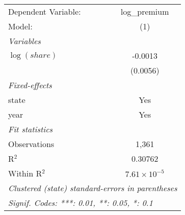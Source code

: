 
\begingroup
\centering
\begin{tabular}{lc}
   \tabularnewline \midrule \midrule
   Dependent Variable: & log\_premium\\   
   Model:              & (1)\\  
   \midrule
   \emph{Variables}\\
   $\log(share)$       & -0.0013\\   
                       & (0.0056)\\   
   \midrule
   \emph{Fixed-effects}\\
   state               & Yes\\  
   year                & Yes\\  
   \midrule
   \emph{Fit statistics}\\
   Observations        & 1,361\\  
   R$^2$               & 0.30762\\  
   Within R$^2$        & $7.61\times 10^{-5}$\\   
   \midrule \midrule
   \multicolumn{2}{l}{\emph{Clustered (state) standard-errors in parentheses}}\\
   \multicolumn{2}{l}{\emph{Signif. Codes: ***: 0.01, **: 0.05, *: 0.1}}\\
\end{tabular}
\par\endgroup


